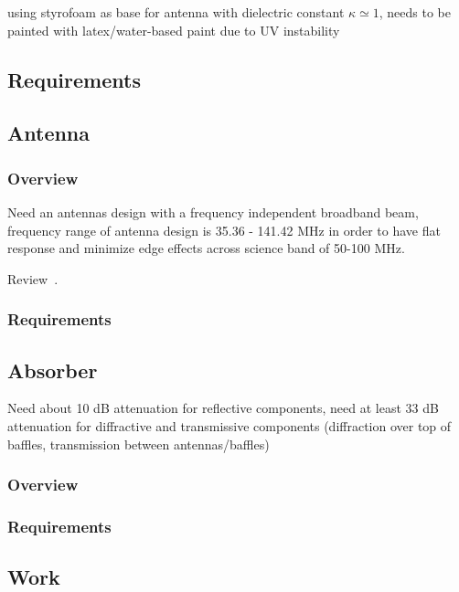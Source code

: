 \documentclass[11pt]{report}
\begin{document}
using styrofoam as base for antenna with dielectric constant $\kappa \simeq 1$, 
needs to be painted with latex/water-based paint due to UV instability

\subsection{Requirements}

\subsection{Antenna}

\subsubsection{Overview}

Need an antennas design with a frequency independent broadband beam, frequency 
range of antenna design is 35.36 - 141.42 MHz in order to have flat response 
and minimize edge effects across science band of 50-100 MHz.

Review~\citep{sys-specs}.

\subsubsection{Requirements}

\subsection{Absorber}

Need about 10 dB attenuation for reflective components, need at least 33 dB 
attenuation for diffractive and transmissive components (diffraction over top 
of baffles, transmission between antennas/baffles)

\subsubsection{Overview}

\subsubsection{Requirements}

\subsection{Work}
\end{document}

